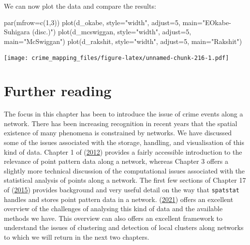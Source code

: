 \documentclass[
  krantz2]{krantz}
\makeatletter
\newenvironment{Shaded}{\begin{snugshade}}{\end{snugshade}}
\newcommand{\AttributeTok}[1]{\textcolor[rgb]{0.61,0.61,0.61}{#1}}
\newcommand{\DecValTok}[1]{\textcolor[rgb]{0.06,0.06,0.06}{#1}}
\newcommand{\FunctionTok}[1]{\textcolor[rgb]{0,0,0}{#1}}
\newcommand{\NormalTok}[1]{#1}
\newcommand{\StringTok}[1]{\textcolor[rgb]{0.5,0.5,0.5}{#1}}
\newenvironment{kframe}{%
\medskip{}
\setlength{\fboxsep}{.8em}
 \def\at@end@of@kframe{}%
 \ifinner\ifhmode%
  \def\at@end@of@kframe{\end{minipage}}%
  \begin{minipage}{\columnwidth}%
 \fi\fi%
 \def\FrameCommand##1{\hskip\@totalleftmargin \hskip-\fboxsep
 \colorbox{shadecolor}{##1}\hskip-\fboxsep
     \hskip-\linewidth \hskip-\@totalleftmargin \hskip\columnwidth}%
 \MakeFramed {\advance\hsize-\width
   \@totalleftmargin\z@ \linewidth\hsize
   \@setminipage}}%
 {\par\unskip\endMakeFramed%
 \at@end@of@kframe}
\renewenvironment{Shaded}{\begin{kframe}}{\end{kframe}}
\makeatother
\begin{document}
We can now plot the data and compare the results:

\begin{Shaded}
\begin{Highlighting}[]
\FunctionTok{par}\NormalTok{(}\AttributeTok{mfrow=}\FunctionTok{c}\NormalTok{(}\DecValTok{1}\NormalTok{,}\DecValTok{3}\NormalTok{))}
\FunctionTok{plot}\NormalTok{(d\_okabe, }\AttributeTok{style=}\StringTok{"width"}\NormalTok{, }\AttributeTok{adjust=}\DecValTok{5}\NormalTok{, }\AttributeTok{main=}\StringTok{"EOkabe{-}Suhigara (disc.)"}\NormalTok{)}
\FunctionTok{plot}\NormalTok{(d\_mcswiggan, }\AttributeTok{style=}\StringTok{"width"}\NormalTok{, }\AttributeTok{adjust=}\DecValTok{5}\NormalTok{, }\AttributeTok{main=}\StringTok{"McSwiggan"}\NormalTok{)}
\FunctionTok{plot}\NormalTok{(d\_rakshit, }\AttributeTok{style=}\StringTok{"width"}\NormalTok{, }\AttributeTok{adjust=}\DecValTok{5}\NormalTok{, }\AttributeTok{main=}\StringTok{"Rakshit"}\NormalTok{)}
\end{Highlighting}
\end{Shaded}

\texttt{[image: crime\_mapping\_files/figure-latex/unnamed-chunk-216-1.pdf]}

\hypertarget{further-reading}{%
\section{Further reading}\label{further-reading}}

The focus in this chapter has been to introduce the issue of crime events along a network. There has been increasing recognition in recent years that the spatial existence of many phenomena is constrained by networks. We have discussed some of the issues associated with the storage, handling, and visualisation of this kind of data. Chapter 1 of (\protect\hyperlink{ref-Okabe_2012}{2012}) provides a fairly accessible introduction to the relevance of point pattern data along a network, whereas Chapter 3 offers a slightly more technical discussion of the computational issues associated with the statistical analysis of points along a network. The first few sections of Chapter 17 of (\protect\hyperlink{ref-Baddeley_2016}{2015}) provides background and very useful detail on the way that \texttt{spatstat} handles and stores point pattern data in a network. (\protect\hyperlink{ref-Baddeley_2021}{2021}) offers an excellent overview of the challenges of analysing this kind of data and the available methods we have. This overview can also offers an excellent framework to understand the issues of clustering and detection of local clusters along networks to which we will return in the next two chapters.
\end{document}
